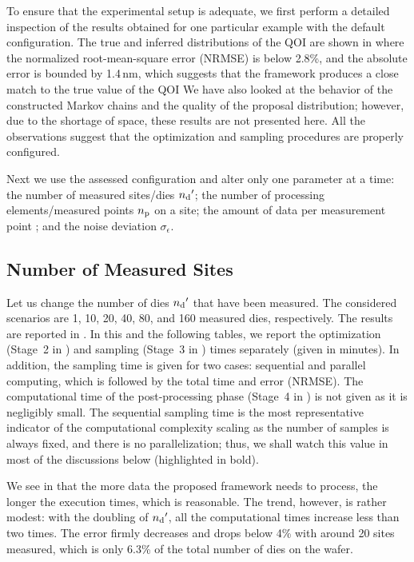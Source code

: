 To ensure that the experimental setup is adequate, we first perform a detailed
inspection of the results obtained for one particular example with the default
configuration. The true and inferred distributions of the \ac{QOI} are shown in
 where the normalized root-mean-square error (NRMSE) is below
2.8\%, and the absolute error is bounded by 1.4$\,$nm, which suggests that the
framework produces a close match to the true value of the \ac{QOI} We have also
looked at the behavior of the constructed Markov chains and the quality of the
proposal distribution; however, due to the shortage of space, these results are
not presented here. All the observations suggest that the optimization and
sampling procedures are properly configured.

Next we use the assessed configuration and alter only one parameter at a time:
the number of measured sites/dies ${n_\mathrm{d}}'$; the number of processing
elements/measured points ${n_\mathrm{p}}$ on a site; the amount of data per measurement
point \ns; and the noise deviation $\sigma_\epsilon$.

\subsection{Number of Measured Sites}

Let us change the number of dies ${n_\mathrm{d}}'$ that have been measured. The considered
scenarios are 1, 10, 20, 40, 80, and 160 measured dies, respectively. The
results are reported in . In this and the following
tables, we report the optimization (Stage~2 in ) and sampling
(Stage~3 in ) times separately (given in minutes). In addition,
the sampling time is given for two cases: sequential and parallel computing,
which is followed by the total time and error (NRMSE). The computational time of
the post-processing phase (Stage~4 in ) is not given as it is
negligibly small. The sequential sampling time is the most representative
indicator of the computational complexity scaling as the number of samples is
always fixed, and there is no parallelization; thus, we shall watch this value
in most of the discussions below (highlighted in bold).

We see in  that the more data the proposed framework
needs to process, the longer the execution times, which is reasonable. The
trend, however, is rather modest: with the doubling of ${n_\mathrm{d}}'$, all the
computational times increase less than two times. The error firmly decreases and
drops below 4\% with around 20 sites measured, which is only 6.3\% of the total
number of dies on the wafer.

